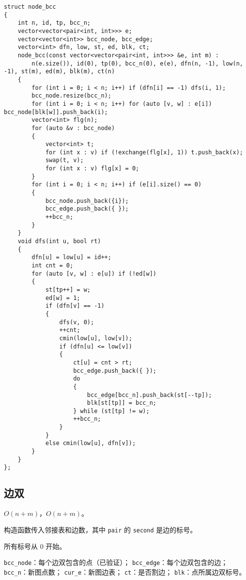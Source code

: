 \documentclass[12pt]{ctexart}
\begin{document}
\begin{lstlisting}
struct node_bcc
{
	int n, id, tp, bcc_n;
	vector<vector<pair<int, int>>> e;
	vector<vector<int>> bcc_node, bcc_edge;
	vector<int> dfn, low, st, ed, blk, ct;
	node_bcc(const vector<vector<pair<int, int>>> &e, int m) :
		n(e.size()), id(0), tp(0), bcc_n(0), e(e), dfn(n, -1), low(n, -1), st(m), ed(m), blk(m), ct(n)
	{
		for (int i = 0; i < n; i++) if (dfn[i] == -1) dfs(i, 1);
		bcc_node.resize(bcc_n);
		for (int i = 0; i < n; i++) for (auto [v, w] : e[i]) bcc_node[blk[w]].push_back(i);
		vector<int> flg(n);
		for (auto &v : bcc_node)
		{
			vector<int> t;
			for (int x : v) if (!exchange(flg[x], 1)) t.push_back(x);
			swap(t, v);
			for (int x : v) flg[x] = 0;
		}
		for (int i = 0; i < n; i++) if (e[i].size() == 0)
		{
			bcc_node.push_back({i});
			bcc_edge.push_back({ });
			++bcc_n;
		}
	}
	void dfs(int u, bool rt)
	{
		dfn[u] = low[u] = id++;
		int cnt = 0;
		for (auto [v, w] : e[u]) if (!ed[w])
		{
			st[tp++] = w;
			ed[w] = 1;
			if (dfn[v] == -1)
			{
				dfs(v, 0);
				++cnt;
				cmin(low[u], low[v]);
				if (dfn[u] <= low[v])
				{
					ct[u] = cnt > rt;
					bcc_edge.push_back({ });
					do
					{
						bcc_edge[bcc_n].push_back(st[--tp]);
						blk[st[tp]] = bcc_n;
					} while (st[tp] != w);
					++bcc_n;
				}
			}
			else cmin(low[u], dfn[v]);
		}
	}
};
\end{lstlisting}

\subsection{边双}

$O(n+m)$，$O(n+m)$。

构造函数传入邻接表和边数，其中 \verb|pair| 的 \verb|second| 是边的标号。

所有标号从 $0$ 开始。

\verb|bcc_node|：每个边双包含的点（已验证）；
\verb|bcc_edge|：每个边双包含的边；
\verb|bcc_n|：新图点数；
\verb|cur_e|：新图边表；
\verb|ct|：是否割边；
\verb|blk|：点所属边双标号。
\end{document}
